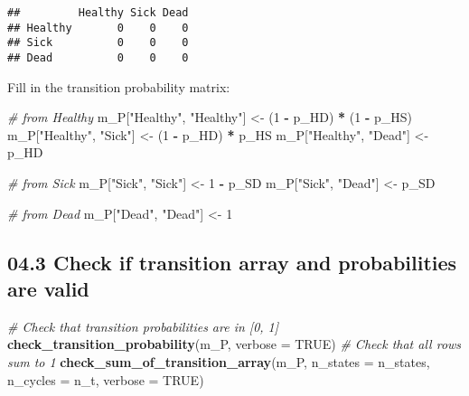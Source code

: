 \documentclass[
]{article}
\newenvironment{Shaded}{\begin{snugshade}}{\end{snugshade}}
\newcommand{\CommentTok}[1]{\textcolor[rgb]{0.56,0.35,0.01}{\textit{#1}}}
\newcommand{\DataTypeTok}[1]{\textcolor[rgb]{0.13,0.29,0.53}{#1}}
\newcommand{\DecValTok}[1]{\textcolor[rgb]{0.00,0.00,0.81}{#1}}
\newcommand{\KeywordTok}[1]{\textcolor[rgb]{0.13,0.29,0.53}{\textbf{#1}}}
\newcommand{\NormalTok}[1]{#1}
\newcommand{\OperatorTok}[1]{\textcolor[rgb]{0.81,0.36,0.00}{\textbf{#1}}}
\newcommand{\OtherTok}[1]{\textcolor[rgb]{0.56,0.35,0.01}{#1}}
\newcommand{\StringTok}[1]{\textcolor[rgb]{0.31,0.60,0.02}{#1}}
\begin{document}
\begin{verbatim}
##         Healthy Sick Dead
## Healthy       0    0    0
## Sick          0    0    0
## Dead          0    0    0
\end{verbatim}

Fill in the transition probability matrix:

\begin{Shaded}
\begin{Highlighting}[]
\CommentTok{# from Healthy}
\NormalTok{m_P[}\StringTok{"Healthy"}\NormalTok{, }\StringTok{"Healthy"}\NormalTok{] <-}\StringTok{ }\NormalTok{(}\DecValTok{1} \OperatorTok{-}\StringTok{ }\NormalTok{p_HD) }\OperatorTok{*}\StringTok{ }\NormalTok{(}\DecValTok{1} \OperatorTok{-}\StringTok{ }\NormalTok{p_HS)}
\NormalTok{m_P[}\StringTok{"Healthy"}\NormalTok{, }\StringTok{"Sick"}\NormalTok{]    <-}\StringTok{ }\NormalTok{(}\DecValTok{1} \OperatorTok{-}\StringTok{ }\NormalTok{p_HD) }\OperatorTok{*}\StringTok{ }\NormalTok{p_HS}
\NormalTok{m_P[}\StringTok{"Healthy"}\NormalTok{, }\StringTok{"Dead"}\NormalTok{]    <-}\StringTok{ }\NormalTok{p_HD}

\CommentTok{# from Sick}
\NormalTok{m_P[}\StringTok{"Sick"}\NormalTok{, }\StringTok{"Sick"}\NormalTok{] <-}\StringTok{ }\DecValTok{1} \OperatorTok{-}\StringTok{ }\NormalTok{p_SD}
\NormalTok{m_P[}\StringTok{"Sick"}\NormalTok{, }\StringTok{"Dead"}\NormalTok{] <-}\StringTok{ }\NormalTok{p_SD}

\CommentTok{# from Dead}
\NormalTok{m_P[}\StringTok{"Dead"}\NormalTok{, }\StringTok{"Dead"}\NormalTok{] <-}\StringTok{ }\DecValTok{1}
\end{Highlighting}
\end{Shaded}

\hypertarget{check-if-transition-array-and-probabilities-are-valid}{%
\subsection{04.3 Check if transition array and probabilities are
valid}\label{check-if-transition-array-and-probabilities-are-valid}}

\begin{Shaded}
\begin{Highlighting}[]
\CommentTok{# Check that transition probabilities are in [0, 1]}
\KeywordTok{check_transition_probability}\NormalTok{(m_P, }\DataTypeTok{verbose =} \OtherTok{TRUE}\NormalTok{)}
\CommentTok{# Check that all rows sum to 1}
\KeywordTok{check_sum_of_transition_array}\NormalTok{(m_P, }\DataTypeTok{n_states =}\NormalTok{ n_states, }\DataTypeTok{n_cycles =}\NormalTok{ n_t, }\DataTypeTok{verbose =} \OtherTok{TRUE}\NormalTok{)}
\end{Highlighting}
\end{Shaded}
\end{document}
